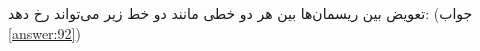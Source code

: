 \section{}
\paragraph{}\label{hint:241}
تعویض بین ریسمان‌ها بین هر دو خطی مانند دو خط زیر می‌تواند رخ دهد:
\LTR\noindent
{}
\RTL
(جواب \ref{answer:92})